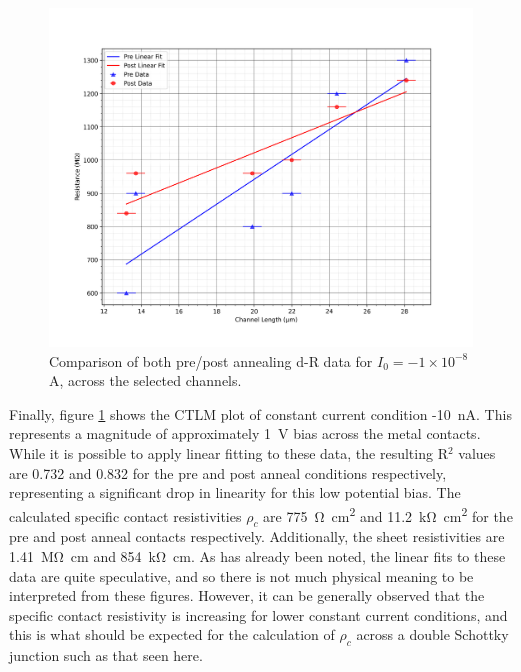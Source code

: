 \begin{refsection}
\begin{figure}[H]
    \centering
    \includegraphics[width=\textwidth]{Chapter3/Figs/Raster/Sample F 2022/Comparison/1e-08A.png}
    \caption{Comparison of both pre/post annealing d-R data for $I_{0}=-1\times10^{-8}$ \si{\ampere}, across the selected channels.}
    \label{fig:comparison-dr-1e-8}
\end{figure}

Finally, figure \ref{fig:comparison-dr-1e-8} shows the CTLM plot of constant current condition -10~\si{\nano\ampere}. This represents a magnitude of approximately 1~\si{\volt} bias across the metal contacts. While it is possible to apply linear fitting to these data, the resulting R$^{2}$ values are 0.732 and 0.832 for the pre and post anneal conditions respectively, representing a significant drop in linearity for this low potential bias. The calculated specific contact resistivities $\rho_{c}$ are 775~\si{\ohm\centi\metre\squared} and 11.2~\si{\kilo\ohm\centi\metre\squared} for the pre and post anneal contacts respectively. Additionally, the sheet resistivities are 1.41~\si{\mega\ohm\centi\metre} and 854~\si{\kilo\ohm\centi\metre}. As has already been noted, the linear fits to these data are quite speculative, and so there is not much physical meaning to be interpreted from these figures. However, it can be generally observed that the specific contact resistivity is increasing for lower constant current conditions, and this is what should be expected for the calculation of $\rho_{c}$ across a double Schottky junction such as that seen here.


\end{refsection}
